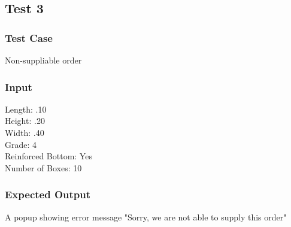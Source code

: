 \documentclass[12pt]{article}
\begin{document}
\subsection{Test 3}
\subsubsection{Test Case}
Non-suppliable order
\subsubsection{Input}
Length: .10\\
Height: .20\\
Width: .40\\
Grade: 4\\
Reinforced Bottom: Yes\\
Number of Boxes: 10\\
\subsubsection{Expected Output}
A popup showing error message "Sorry, we are not able to supply this order"
\end{document}
